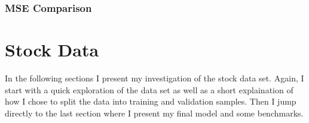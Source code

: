 \documentclass[letterpaper,10pt,english]{sphinxmanual}
\begin{document}
\subsubsection{MSE Comparison}
\label{\detokenize{simulated_final:mse-comparison}}
\begin{sphinxVerbatim}[commandchars=\\\{\}]
  \PYG{p}{[}   \PYG{p}{]}
  \PYG{p}{[}   \PYG{p}{]}
    \PYG{p}{[} \PYG{p}{]}

 
  
         
\end{sphinxVerbatim}

\noindent{}


\section{Stock Data}
\label{\detokenize{stock:stock-data}}\label{\detokenize{stock::doc}}
In the following sections I present my investigation of the stock data set. Again, I start with a quick exploration of the data set as well as a short explaination of how I chose to split the data into training and validation samples. Then I jump directly to the last section where I present my final model and some benchmarks.
\end{document}
